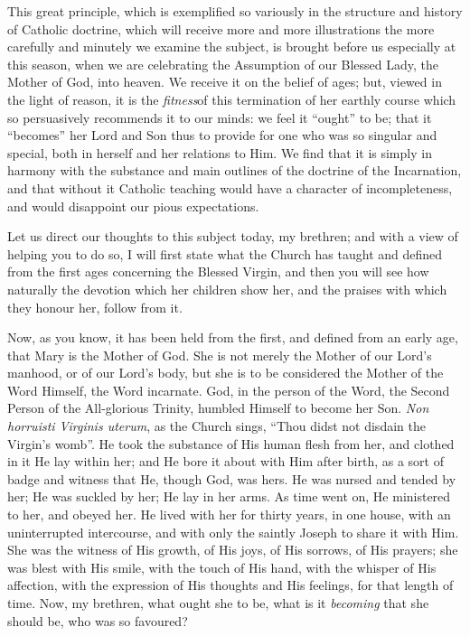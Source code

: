 This great principle, which is exemplified so variously in the
structure and history of Catholic doctrine, which will receive more
and more illustrations the more carefully and minutely we examine the
subject, is brought before us especially at this season, when we are
celebrating the Assumption of our Blessed Lady, the Mother of God,
into heaven. We receive it on the belief of ages; but, viewed in the
light of reason, it is the \emph{fitness}of this termination of her
earthly course which so persuasively recommends it to our minds: we
feel it ``ought'' to be; that it ``becomes'' her Lord
and Son thus to provide for one who was so singular and special, both
in herself and her relations to Him. We find that it is simply in
harmony with the substance and main outlines of the doctrine of the
Incarnation, and that without it Catholic teaching would have a
character of incompleteness, and would disappoint our pious
expectations.

Let us direct our thoughts to this subject today, my brethren; and
with a view of helping you to do so, I will first state what the
Church has taught and defined from the first ages concerning the
Blessed Virgin, and then you will see how naturally the devotion which
her children show her, and the praises with which they honour her,
follow from it.

Now, as you know, it has been held from the first, and defined from
an early age, that Mary is the Mother of God. She is not merely the
Mother of our Lord's manhood, or of our Lord's body, but she is to be
considered the Mother of the Word Himself, the Word incarnate. God, in
the person of the Word, the Second Person of the All-glorious Trinity,
humbled Himself to become her Son. \emph{Non horruisti Virginis uterum},
as the Church sings, ``Thou didst not disdain the Virgin's
womb''. He took the substance of His human flesh from her, and
clothed in it He lay within her; and He bore it about with Him after
birth, as a sort of badge and witness that He, though God, was hers.
He was nursed and tended by her; He was suckled by her; He lay in her
arms. As time went on, He ministered to her, and obeyed her. He lived
with her for thirty years, in one house, with an uninterrupted
intercourse, and with only the saintly Joseph to share it with Him.
She was the witness of His growth, of His joys, of His sorrows, of His
prayers; she was blest with His smile, with the touch of His hand,
with the whisper of His affection, with the expression of His thoughts
and His feelings, for that length of time. Now, my brethren, what
ought she to be, what is it \emph{becoming} that she should be, who
was so favoured?

